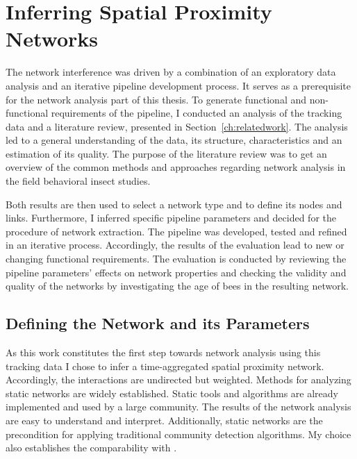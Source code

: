 \section{Inferring Spatial Proximity Networks}
The network interference was driven by a combination of an exploratory data analysis and an iterative pipeline development process.
It serves as a prerequisite for the network analysis part of this thesis.
To generate functional and non-functional requirements of the pipeline, I conducted an analysis of the tracking data and a literature review, presented in Section~\ref{ch:relatedwork}.
The analysis led to a general understanding of the data, its structure, characteristics and an estimation of its quality.
The purpose of the literature review was to get an overview of the common methods and approaches regarding network analysis in the field behavioral insect studies.

Both results are then used to select a network type and to define its nodes and links.
Furthermore, I inferred specific pipeline parameters and decided for the procedure of network extraction.
The pipeline was developed, tested and refined in an iterative process.
Accordingly, the results of the evaluation lead to new or changing functional requirements.
The evaluation is conducted by reviewing the pipeline parameters' effects on network properties and checking the validity and quality of the networks by investigating the age of bees in the resulting network.

\subsection{Defining the Network and its Parameters}
As this work constitutes the first step towards network analysis using this tracking data I chose to infer a time-aggregated spatial proximity network.
Accordingly, the interactions are undirected but weighted.
Methods for analyzing static networks are widely established.
Static tools and algorithms are already implemented and used by a large community.
The results of the network analysis are easy to understand and interpret.
Additionally, static networks are the precondition for applying traditional community detection algorithms. My choice also establishes the comparability with \textcite{mersch2013tracking}.

